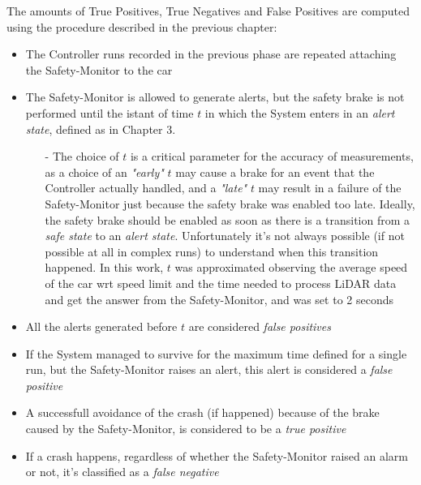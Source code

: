 The amounts of True Positives, True Negatives and False Positives are computed using the procedure described in the previous chapter:

\begin{itemize}
	\item The Controller runs recorded in the previous phase are repeated attaching the Safety-Monitor to the car
	\item The Safety-Monitor is allowed to generate alerts, but the safety brake is not performed until the istant of time $t$ in which the System enters in an \textsl{alert state}, defined as in Chapter 3.
	\begin{itemize}
		\item[-] The choice of $t$ is a critical parameter for the accuracy of measurements, as a choice of an \textsl{"early"} $t$ may cause a brake for an event that the Controller actually handled, and a \textsl{"late"} $t$ may result in a failure of the Safety-Monitor just because the safety brake was enabled too late. Ideally, the safety brake should be enabled as soon as there is a transition from a \textsl{safe state} to an \textsl{alert state}. Unfortunately it's not always possible (if not possible at all in complex runs) to understand when this transition happened. In this work, $t$ was approximated observing the average speed of the car wrt speed limit and the time needed to process LiDAR data and get the answer from the Safety-Monitor, and was set to 2 seconds
	\end{itemize}
	\item All the alerts generated before $t$ are considered \textsl{false positives}
	\item If the System managed to survive for the maximum time defined for a single run, but the Safety-Monitor raises an alert, this alert is considered a \textsl{false positive}
	\item A successfull avoidance of the crash (if happened) because of the brake caused by the Safety-Monitor, is considered to be a \textsl{true positive}
	\item If a crash happens, regardless of whether the Safety-Monitor raised an alarm or not, it's classified as a \textsl{false negative}
\end{itemize}

